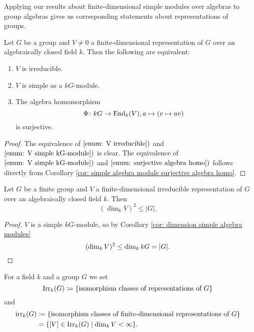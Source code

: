 Applying our results about finite-dimensional simple modules over algebras to group algebras gives us corresponding statements about representations of groups.


\begin{lem}\label{lem: equivalence to irreducible}
 Let $G$ be a group and $V \neq 0$ a finite-dimensional representation of $G$ over an algebraically closed field $k$. Then the following are equivalent:
 \begin{enumerate}[label=\emph{\roman*})]
  \item\label{enum: V irreducible}
   $V$ is irreducible.
  \item\label{enum: V simple kG-module}
   $V$ is simple as a $kG$-module.
  \item\label{enum: surjective algebra homo}
   The algebra homomorphism
   \[
    \Phi \colon kG \to \operatorname{End}_k(V), a \mapsto (v \mapsto av)
   \]
   is surjective.
 \end{enumerate}
\end{lem}
\begin{proof}
 The equivalence of $\ref{enum: V irreducible})$ and $\ref{enum: V simple kG-module})$ is clear. The equivalence of $\ref{enum: V simple kG-module})$ and $\ref{enum: surjective algebra homo})$ follows directly from Corollary \ref{cor: simple algebra module surjective algebra homo}.
\end{proof}


\begin{cor}
 Let $G$ be a finite group and $V$ a finite-dimensional irreducible representation of $G$ over an algebraically closed field $k$. Then
 \[
  \left( \dim_k V \right)^2 \leq |G|.
 \]
\end{cor}
\begin{proof}
 $V$ is a simple $kG$-module, so by Corollary \ref{cor: dimension simple algebra modules}
 \[
  (\dim_k V)^2 \leq \dim_k kG = |G|.
  \qedhere
 \]
\end{proof}


\begin{defi}
 For a field $k$ and a group $G$ we set
 \[
  \operatorname{Irr}_k(G) \coloneqq \{\text{isomorphism classes of representations of $G$}\}
 \]
 and
 \begin{align*}
  \operatorname{irr}_k(G)
  &\coloneqq \{\text{isomorphism classes of finite-dimensional representations of $G$}\} \\
  &= \{[V] \in \operatorname{Irr}_k(G) \mid \dim_k V < \infty\}.
 \end{align*}
\end{defi}


